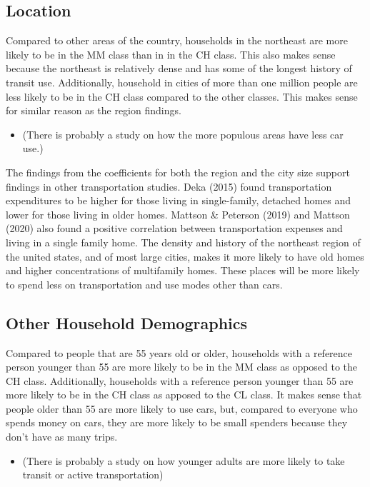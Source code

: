 \documentclass[
]{agujournal2019}
\providecommand{\tightlist}{%
  \setlength{\itemsep}{0pt}\setlength{\parskip}{0pt}}
\begin{document}
\subsection{Location}\label{location}

Compared to other areas of the country, households in the northeast are
more likely to be in the MM class than in in the CH class. This also
makes sense because the northeast is relatively dense and has some of
the longest history of transit use. Additionally, household in cities of
more than one million people are less likely to be in the CH class
compared to the other classes. This makes sense for similar reason as
the region findings.

\begin{itemize}
\tightlist
\item
  (There is probably a study on how the more populous areas have less
  car use.)
\end{itemize}

The findings from the coefficients for both the region and the city size
support findings in other transportation studies. Deka (2015) found
transportation expenditures to be higher for those living in
single-family, detached homes and lower for those living in older homes.
Mattson \& Peterson (2019) and Mattson (2020) also found a positive
correlation between transportation expenses and living in a single
family home. The density and history of the northeast region of the
united states, and of most large cities, makes it more likely to have
old homes and higher concentrations of multifamily homes. These places
will be more likely to spend less on transportation and use modes other
than cars.

\subsection{Other Household
Demographics}\label{other-household-demographics}

Compared to people that are 55 years old or older, households with a
reference person younger than 55 are more likely to be in the MM class
as opposed to the CH class. Additionally, households with a reference
person younger than 55 are more likely to be in the CH class as apposed
to the CL class. It makes sense that people older than 55 are more
likely to use cars, but, compared to everyone who spends money on cars,
they are more likely to be small spenders because they don't have as
many trips.

\begin{itemize}
\tightlist
\item
  (There is probably a study on how younger adults are more likely to
  take transit or active transportation)
\end{itemize}
\end{document}
